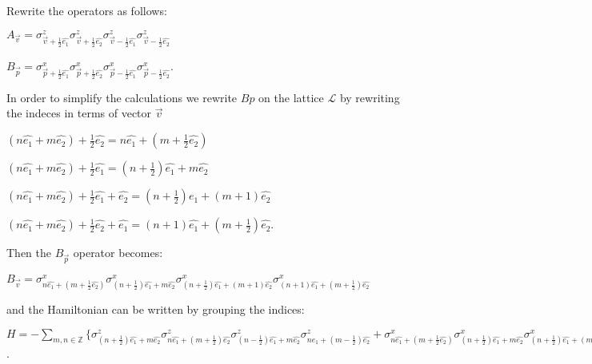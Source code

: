 \documentclass{Configuration_Files/PoliMi3i_thesis}
\begin{document}
Rewrite the operators as follows: \newline

\begin{center}
	
	$A_{\vec{v}} = \sigma^z_{\vec{v}+\frac{1}{2}\hat{e_1}} \sigma^z_{\vec{v}+\frac{1}{2}\hat{e_2}} \sigma^z_{\vec{v}-\frac{1}{2}\hat{e_1}} \sigma^z_{\vec{v}-\frac{1}{2}\hat{e_2}}$ 
	
	$B_{\vec{p}} = \sigma^x_{\vec{p}+\frac{1}{2}\hat{e_1}} \sigma^x_{\vec{p}+\frac{1}{2}\hat{e_2}} \sigma^x_{\vec{p}-\frac{1}{2}\hat{e_1}} \sigma^x_{\vec{p}-\frac{1}{2}\hat{e_2}}$.
	
\end{center}

In order to simplify the calculations we rewrite $Bp$ on the lattice $\mathcal{L}$ by rewriting the indeces in terms of vector $\vec{v}$ \newline

\begin{center}
	$(n\hat{e_1} + m\hat{e_2}) + \frac{1}{2}\hat{e_2}= n\hat{e_1} + (m+\frac{1}{2}\hat{e_2})$
	
	$(n\hat{e_1} + m\hat{e_2}) + \frac{1}{2}\hat{e_1}= (n+ \frac{1}{2})\hat{e_1} + m\hat{e_2}$
	
	$(n\hat{e_1} + m\hat{e_2}) + \frac{1}{2}\hat{e_1}+\hat{e_2}= (n+ \frac{1}{2})\hat{e_1} + (m + 1)\hat{e_2}$
	
	$(n\hat{e_1} + m\hat{e_2}) + \frac{1}{2}\hat{e_2}+\hat{e_1}= (n+ 1)\hat{e_1} + (m + \frac{1}{2})\hat{e_2}$.
\end{center}


Then the $B_{\vec{p}}$ operator becomes: \newline

\begin{center}
	
	$B_{\vec{v}} = \sigma^x_{n\hat{e_1} + (m+\frac{1}{2}\hat{e_2})} \sigma^x_{(n+ \frac{1}{2})\hat{e_1} + m\hat{e_2}} \sigma^x_{(n+ \frac{1}{2})\hat{e_1} + (m + 1)\hat{e_2}} \sigma^x_{(n+ 1)\hat{e_1} + (m + \frac{1}{2})\hat{e_2}}$ \newline
	
\end{center}

and the Hamiltonian can be written by grouping the indices: \newline

\begin{center}
	
	$H = - \sum_{m,n \in \mathbb{Z}} \{ 
	\sigma^z_{(n+\frac{1}{2})\hat{e_1} + m\hat{e_2}} \sigma^z_{n\hat{e_1}+(m+\frac{1}{2})\hat{e_2}} \sigma^z_{(n-\frac{1}{2})\hat{e_1} + m\hat{e_2}} \sigma^z_{n\hat{e_1}+(m-\frac{1}{2})\hat{e_2}} +
	\sigma^x_{n\hat{e_1} + (m+\frac{1}{2}\hat{e_2})} \sigma^x_{(n+ \frac{1}{2})\hat{e_1} + m\hat{e_2}} \sigma^x_{(n+ \frac{1}{2})\hat{e_1} + (m + 1)\hat{e_2}} \sigma^x_{(n+ 1)\hat{e_1} + (m + \frac{1}{2})\hat{e_2}} \} $.\newline
	
\end{center}
\end{document}
